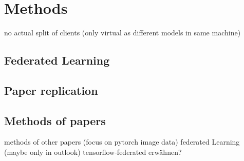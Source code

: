 \section{Methods}

no actual split of clients (only virtual as different models in same machine)

\subsection{Federated Learning}


\subsection{Paper replication}

\subsection{Methods of papers}

methods of other papers (focus on pytorch image data)
federated Learning
(maybe only in outlook) tensorflow-federated erwähnen?

